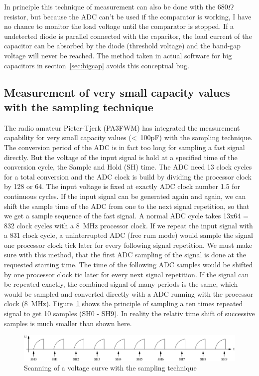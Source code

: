 In principle this technique of measurement can also be done with the \(680\Omega\) resistor, but 
because the ADC can't be used if the comparator is working, I have no chance to monitor the
load voltage until the comparator is stopped. If a undetected diode is parallel connected with
the capacitor, the load current of the capacitor can be absorbed by the diode (threshold voltage) and
the band-gap voltage will never be reached.
The method taken in actual software for big capacitors in section~\ref{sec:bigcap}
avoids this conceptual bug.

\subsection{Measurement of very small capacity values with the sampling technique}
The radio amateur Pieter-Tjerk (PA3FWM) has integrated the measurement capability for very small
capacity values (\textless~100pF) with the sampling technique.
The conversion period of the ADC is in fact too long for sampling a fast signal directly.
But the voltage of the input signal is hold at a specified time of the conversion cycle,
the Sample and Hold (SH) time.
The ADC need 13 clock cycles for a total conversion and the ADC clock is build by dividing the
processor clock by 128 or 64.
The input voltage is fixed at exactly ADC clock number 1.5 for continuous cycles.
If the input signal can be generated again and again, we can shift the sample time of the ADC from
one to the next signal repetition, so that we get a sample sequence of the fast signal.
A normal ADC cycle takes 13x64 = 832 clock cycles with a 8~MHz processor clock.
If we repeat the input signal with a 831 clock cycle, a uninterrupted ADC (free rum mode) would
sample the signal one processor clock tick later for every following signal repetition.
We must make sure with this method, that the first ADC sampling of the signal is done at
the requested starting time. The time of the following ADC samples would be shifted by one processor clock
tic later for every next signal repetition.
If the signal can be repeated exactly, the combined signal of many periods is the same, 
which would be sampled and converted directly with a ADC running with the processor clock (8~MHz).
Figure~\ref{fig:sampling} shows the principle of sampling a ten times repeated signal
to get 10 samples (SH0 - SH9).
In reality the relativ time shift of successive samples is much smaller than shown here.

\begin{figure}[H]
\centering
\includegraphics[width=1.\textwidth]{../FIG/sampling.pdf}
\caption{Scanning of a voltage curve with the sampling technique}
\label{fig:sampling}
\end{figure}

